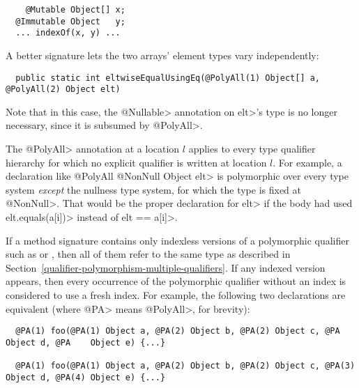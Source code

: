 \begin{Verbatim}
    @Mutable Object[] x;
  @Immutable Object   y;
  ... indexOf(x, y) ...
\end{Verbatim}

\noindent
A better signature lets the two arrays' element types vary independently:

\begin{Verbatim}
  public static int eltwiseEqualUsingEq(@PolyAll(1) Object[] a, @PolyAll(2) Object elt)
\end{Verbatim}

\noindent
Note that in this case, the \<@Nullable> annotation on \<elt>'s type is no
longer necessary, since it is subsumed by \<@PolyAll>.

The \<@PolyAll> annotation at a location $l$ applies to every type
qualifier hierarchy for which no explicit qualifier is written at location
$l$.  For example, a declaration like
\<@PolyAll @NonNull Object elt> is polymorphic over every type system
\emph{except} the nullness type system, for which the type is fixed at
\<@NonNull>.  That would be the proper declaration for \<elt> if the body
had used \<elt.equals(a[i])> instead of \<elt == a[i]>.



If a method signature contains only indexless versions of a polymorphic
qualifier such as  or
, then all of them refer to
the same type as described in
Section~\ref{qualifier-polymorphism-multiple-qualifiers}.  If any indexed
version appears, then every occurrence of the polymorphic qualifier without
an index is considered to use a fresh index.  For example, the following
two declarations are equivalent (where \<@PA> means \<@PolyAll>, for brevity):

\begin{smaller}
\begin{Verbatim}
  @PA(1) foo(@PA(1) Object a, @PA(2) Object b, @PA(2) Object c, @PA    Object d, @PA    Object e) {...}

  @PA(1) foo(@PA(1) Object a, @PA(2) Object b, @PA(2) Object c, @PA(3) Object d, @PA(4) Object e) {...}
\end{Verbatim}
\end{smaller}

